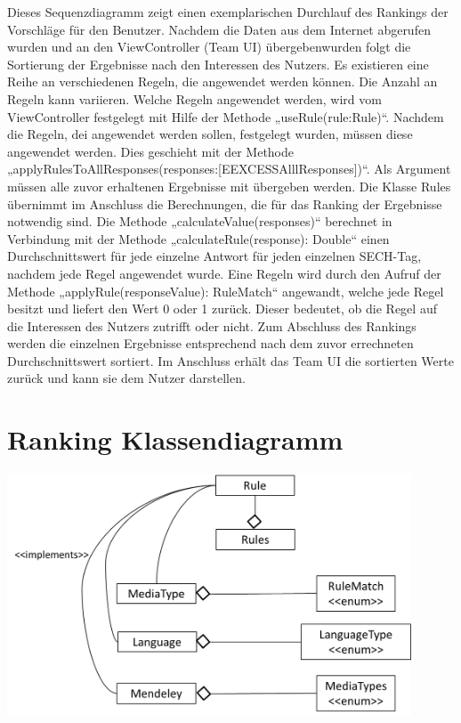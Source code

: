 \documentclass[a4paper,10pt]{article}
\begin{document}
Dieses Sequenzdiagramm zeigt einen exemplarischen Durchlauf des Rankings der Vorschläge für den Benutzer. Nachdem die Daten aus dem Internet abgerufen wurden und an den ViewController (Team UI) übergebenwurden folgt die Sortierung der Ergebnisse nach den Interessen des Nutzers. Es existieren eine Reihe an verschiedenen Regeln, die angewendet werden können. Die Anzahl an Regeln kann variieren. Welche Regeln angewendet werden, wird vom ViewController festgelegt mit Hilfe der Methode „useRule(rule:Rule)“. Nachdem die Regeln, dei angewendet werden sollen, festgelegt wurden, müssen diese angewendet werden. Dies geschieht mit der Methode „applyRulesToAllResponses(responses:[EEXCESSAlllResponses])“. Als Argument müssen alle zuvor erhaltenen Ergebnisse mit übergeben werden. Die Klasse Rules übernimmt im Anschluss die Berechnungen, die für das Ranking der Ergebnisse notwendig sind. Die Methode „calculateValue(responses)“ berechnet in Verbindung mit der Methode „calculateRule(response): Double“ einen Durchschnittswert für jede einzelne Antwort für jeden einzelnen SECH-Tag, nachdem jede Regel angewendet wurde. Eine Regeln wird durch den Aufruf der Methode „applyRule(responseValue): RuleMatch“ angewandt, welche jede Regel besitzt und liefert den Wert 0 oder 1 zurück. Dieser bedeutet, ob die Regel auf die Interessen des Nutzers zutrifft oder nicht. Zum Abschluss des Rankings werden die einzelnen Ergebnisse entsprechend nach dem zuvor errechneten Durchschnittswert sortiert. Im Anschluss erhält das Team UI die sortierten Werte zurück und kann sie dem Nutzer darstellen. 

\section{Ranking Klassendiagramm}

\includegraphics[width=12cm]{Pics/Klassendiagramm_Ranking}
\end{document}
